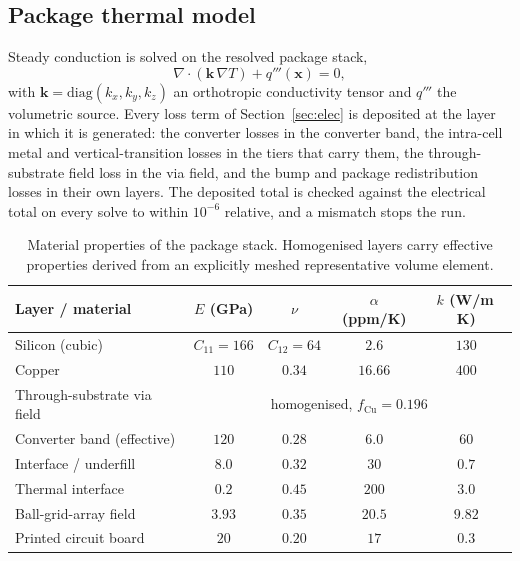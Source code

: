 \documentclass[journal]{IEEEtran}
\begin{document}
\subsection{Package thermal model}
Steady conduction is solved on the resolved package stack,
\begin{equation}
\nabla \cdot \left( \mathbf{k}\, \nabla T \right) + q'''\!\left(\mathbf{x}\right) = 0,
\label{eq:cond}
\end{equation}
with $\mathbf{k} = \mathrm{diag}(k_{x},k_{y},k_{z})$ an orthotropic conductivity tensor and
$q'''$ the volumetric source. Every loss term of Section~\ref{sec:elec} is deposited at the
layer in which it is generated: the converter losses in the converter band, the intra-cell
metal and vertical-transition losses in the tiers that carry them, the through-substrate
field loss in the via field, and the bump and package redistribution losses in their own
layers. The deposited total is checked against the electrical total on every solve to within
$10^{-6}$ relative, and a mismatch stops the run.

\begin{table}[!t]
\caption{Material properties of the package stack. Homogenised layers carry effective
properties derived from an explicitly meshed representative volume element.}
\label{tab:mat}
\centering
\footnotesize
\setlength{\tabcolsep}{3.5pt}
\begin{tabular}{@{}lcccc@{}}
\toprule
Layer / material & $E$ (GPa) & $\nu$ & $\alpha$ (ppm/K) & $k$ (W/m\,K) \\
\midrule
Silicon (cubic) & $C_{11}{=}166$ & $C_{12}{=}64$ & $2.6$ & $130$ \\
Copper & $110$ & $0.34$ & $16.66$ & $400$ \\
Through-substrate via field & \multicolumn{4}{c}{homogenised, $f_{\mathrm{Cu}}{=}0.196$} \\
Converter band (effective) & $120$ & $0.28$ & $6.0$ & $60$ \\
Interface / underfill & $8.0$ & $0.32$ & $30$ & $0.7$ \\
Thermal interface & $0.2$ & $0.45$ & $200$ & $3.0$ \\
Ball-grid-array field & $3.93$ & $0.35$ & $20.5$ & $9.82$ \\
Printed circuit board & $20$ & $0.20$ & $17$ & $0.3$ \\
\bottomrule
\end{tabular}
\end{table}
\end{document}
